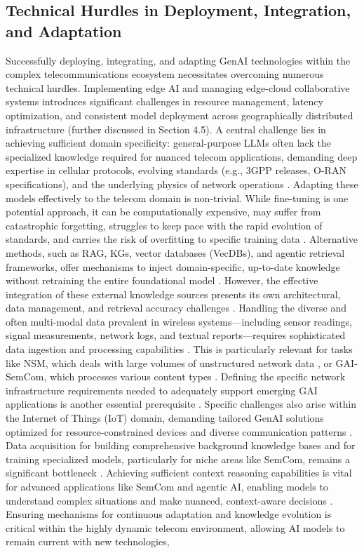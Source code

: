 \documentclass[sigconf]{acmart}
\begin{document}
\subsection{Technical Hurdles in Deployment, Integration, and Adaptation}
\label{sec:technical_hurdles}

Successfully deploying, integrating, and adapting GenAI technologies within the complex telecommunications ecosystem necessitates overcoming numerous technical hurdles. Implementing edge AI and managing edge-cloud collaborative systems introduces significant challenges in resource management, latency optimization, and consistent model deployment across geographically distributed infrastructure \cite{ref3, ref14, ref31} (further discussed in Section 4.5). A central challenge lies in achieving sufficient domain specificity: general-purpose LLMs often lack the specialized knowledge required for nuanced telecom applications, demanding deep expertise in cellular protocols, evolving standards (e.g., 3GPP releases, O-RAN specifications), and the underlying physics of network operations \cite{ref4, ref17, ref18, ref25}. Adapting these models effectively to the telecom domain is non-trivial. While fine-tuning is one potential approach, it can be computationally expensive, may suffer from catastrophic forgetting, struggles to keep pace with the rapid evolution of standards, and carries the risk of overfitting to specific training data \cite{ref4, ref8}. Alternative methods, such as RAG, KGs, vector databases (VecDBs), and agentic retrieval frameworks, offer mechanisms to inject domain-specific, up-to-date knowledge without retraining the entire foundational model \cite{ref4, ref8, ref35}. However, the effective integration of these external knowledge sources presents its own architectural, data management, and retrieval accuracy challenges \cite{ref4, ref8}. Handling the diverse and often multi-modal data prevalent in wireless systems—including sensor readings, signal measurements, network logs, and textual reports—requires sophisticated data ingestion and processing capabilities \cite{ref17, ref22, ref23}. This is particularly relevant for tasks like NSM, which deals with large volumes of unstructured network data \cite{ref25}, or GAI-SemCom, which processes various content types \cite{ref22, ref23}. Defining the specific network infrastructure requirements needed to adequately support emerging GAI applications is another essential prerequisite \cite{ref9}. Specific challenges also arise within the Internet of Things (IoT) domain, demanding tailored GenAI solutions optimized for resource-constrained devices and diverse communication patterns \cite{ref15}. Data acquisition for building comprehensive background knowledge bases and for training specialized models, particularly for niche areas like SemCom, remains a significant bottleneck \cite{ref23}. Achieving sufficient context reasoning capabilities is vital for advanced applications like SemCom and agentic AI, enabling models to understand complex situations and make nuanced, context-aware decisions \cite{ref23, ref35}. Ensuring mechanisms for continuous adaptation and knowledge evolution is critical within the highly dynamic telecom environment, allowing AI models to remain current with new technologies, 
\end{document}
